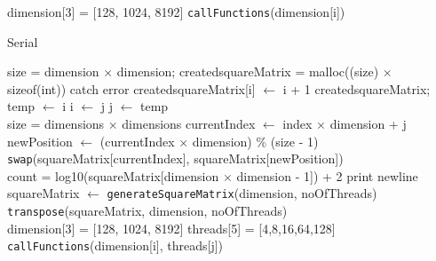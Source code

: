 \documentclass[10pt,twocolumn]{witseiepaper}
\begin{document}
\begin{appendix}
\begin{algorithm}[htbp]
\begin{algorithmic}
		\State dimension[3] = [128, 1024, 8192]
		\State \verb|callFunctions|(dimension[i])
		\EndFor
		\State {}
		\EndFunction
		
		\caption{Serial}
		\label{alg:2}
	\end{algorithmic}
\end{algorithm}

\begin{algorithm}[htbp]
	\begin{algorithmic}
		
		\State size = dimension $\times$ dimension;
		\State created\textunderscore squareMatrix = malloc((size) $\times$ sizeof(int))
		\State catch error
		\EndIf
		\State created\textunderscore squareMatrix[i] $\leftarrow$ i + 1
		\EndFor
		\EndFunction
		\State \Return created\textunderscore squareMatrix; \\
		
		\State temp $\leftarrow$ i
		\State i $\leftarrow$ j
		\State j $\leftarrow$ temp
		\EndFunction \\
		
		\State size = dimensions $\times$ dimensions
		\State currentIndex $\leftarrow$ index $\times$ dimension + j
		\State newPosition $\leftarrow$ (currentIndex $\times$ dimension) \% (size - 1)
		\EndFor
		\EndFor
		\State \verb|swap|(squareMatrix[currentIndex], squareMatrix[newPosition])
		\EndFunction \\
		
		\State count = log10(squareMatrix[dimension $\times$ dimension - 1]) + 2
		\State print newline
		\EndIf
		\EndFor
		\EndFunction \\
		
		\State squareMatrix $\leftarrow$ \verb|generateSquareMatrix|(dimension, noOfThreads)
		\State \verb|transpose|(squareMatrix, dimension, noOfThreads)
		\EndFunction \\
		
		\State dimension[3] = [128, 1024, 8192]
		\State threads[5] = [4,8,16,64,128]
		\State \verb|callFunctions|(dimension[i], threads[j])
		\EndFor
		\EndFor
		\State {}
		\EndFunction
		

\end{algorithmic}
\end{algorithm}
\end{appendix}
\end{document}
